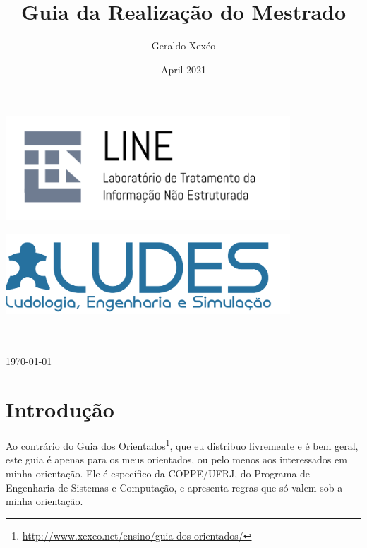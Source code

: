 \documentclass{book}
\title{Guia da Realização do Mestrado}
\author{Geraldo Xexéo}
\date{April 2021}
\begin{document}

\makeatletter
\begin{titlepage}
\begin{center}
\includegraphics[width=0.8\textwidth]{imagens/logo-line-modificado.PNG}
\par
\includegraphics[width=0.8\textwidth]{imagens/LUDES_PP-03.png}
\par
\vspace{3cm}  
\Huge{\textbf{\@title}}
\\[1cm]
\LARGE
\@author
\\[.3cm]
\normalsize
\today
\end{center}
\end{titlepage}
\thispagestyle{empty}
\makeatother


\maketitle

\frontmatter
\tableofcontents

  \mainmatter

\chapter{Introdução}

Ao contrário do Guia dos Orientados\footnote{\url{http://www.xexeo.net/ensino/guia-dos-orientados/}}, que eu distribuo livremente e é bem geral, este guia é apenas para os meus orientados, ou pelo menos aos interessados em minha orientação. Ele é específico da COPPE/UFRJ, do Programa de Engenharia de Sistemas e Computação, e apresenta regras que só valem sob a minha orientação. 

\end{document}
